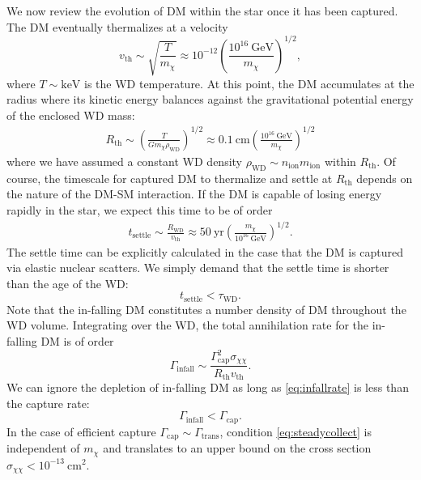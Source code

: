 \documentclass[preprintnumbers,amsmath,amssymb,prd,superscriptaddress]{revtex4}
\newcommand{\GeV}{\text{GeV}}
\newcommand{\keV}{\text{keV}}
\newcommand{\cm}{\text{cm}}
\def\r{\right)}
\def\l{\left(}
\begin{document}
We now review the evolution of DM within the star once it has been captured. 
The DM eventually thermalizes at a velocity
\begin{equation}
v_\text{th} \sim \sqrt{\frac{T}{m_\chi}} \approx 10^{-12} \l \frac{10^{16} ~\GeV}{m_\chi}\r^{1/2},
\end{equation}
where $T \sim \keV$ is the WD temperature.
At this point, the DM accumulates at the radius where its kinetic energy balances against the gravitational potential energy of the enclosed WD mass:
\begin{align}
  R_\text{th} \sim \l \frac{T}{G m_\chi \rho_\text{WD}}\r^{1/2} \approx 0.1 ~\cm \l \frac{10^{16} ~\GeV}{m_\chi}\r^{1/2}
\end{align}
where we have assumed a constant WD density $\rho_\text{WD} \sim n_\text{ion} m_\text{ion}$ within $R_\text{th}$.
Of course, the timescale for captured DM to thermalize and settle at $R_\text{th}$ depends on the nature of the DM-SM interaction.
If the DM is capable of losing energy rapidly in the star, we expect this time to be of order
\begin{align}
\label{eq:tdrift}
  t_\text{settle} \sim \frac{R_\text{WD}}{v_\text{th}}
  \approx 50 ~\text{yr} \l \frac{m_\chi}{10^{16} ~\GeV} \r^{1/2}. 
\end{align}
The settle time can be explicitly calculated in the case that the DM is captured via elastic nuclear scatters. 
We simply demand that the settle time is shorter than the age of the WD:
\begin{equation}
t_\text{settle} < \tau_\text{WD}.
\end{equation}
Note that the in-falling DM constitutes a number density of DM throughout the WD volume.
Integrating over the WD, the total annihilation rate for the in-falling DM is of order
\begin{equation}
\label{eq:infallrate}
\Gamma_\text{infall} \sim \frac{\Gamma_\text{cap}^2 \sigma_{\chi \chi}}{R_\text{th} v_\text{th}}.
\end{equation}
We can ignore the depletion of in-falling DM as long as \eqref{eq:infallrate} is less than the capture rate:
\begin{equation}
\label{eq:steadycollect}
\Gamma_\text{infall} < \Gamma_\text{cap}.
\end{equation}
In the case of efficient capture $\Gamma_\text{cap} \sim \Gamma_\text{trans}$, condition \eqref{eq:steadycollect} is independent of $m_\chi$ and translates to an upper bound on the cross section $\sigma_{\chi \chi} < 10^{-13} ~\text{cm}^2$. 
\end{document}
